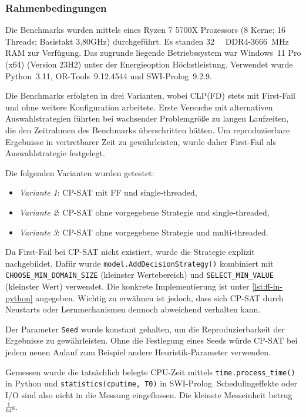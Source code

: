 \documentclass[12pt,a4paper]{article}
\begin{document}
\subsubsection{Rahmenbedingungen}
Die Benchmarks wurden mittels eines Ryzen 7 5700X Prozessors (8 Kerne; 16 Threads; Basistakt 3,80GHz) durchgeführt.
Es standen \SI{32}{\giga\byte} DDR4-\SI{3666}{\mega\hertz} RAM zur Verfügung.
Das zugrunde liegende Betriebssystem war Windows~11 Pro (x64) (Version 23H2) unter der Energieoption \glqq Höchstleistung\grqq.
Verwendet wurde Python~3.11, OR-Tools~9.12.4544 und SWI-Prolog~9.2.9.

Die Benchmarks erfolgten in drei Varianten, wobei CLP(FD) stets mit First-Fail und ohne weitere Konfiguration arbeitete. 
Erste Versuche mit alternativen Auswahlstrategien führten bei wachsender Problemgröße zu langen Laufzeiten, die den Zeitrahmen des Benchmarks überschritten hätten.
Um reproduzierbare Ergebnisse in vertretbarer Zeit zu gewährleisten, wurde daher First-Fail als Auswahlstrategie festgelegt.

\noindent
Die folgenden Varianten wurden getestet:
\begin{itemize}
    \item \emph{Variante 1}: CP-SAT mit FF und single-threaded,
    \item \emph{Variante 2}: CP-SAT ohne vorgegebene Strategie und single-threaded,
    \item \emph{Variante 3}: CP-SAT ohne vorgegebene Strategie und multi-threaded.
\end{itemize}
\noindent
Da First-Fail bei CP-SAT nicht existiert, wurde die Strategie explizit nachgebildet.
Dafür wurde \verb|model.AddDecisionStrategy()| kombiniert mit \texttt{CHOOSE\_MIN\_DOMAIN\_SIZE} (kleinster Wertebereich) und \texttt{SELECT\_MIN\_VALUE} (kleinster Wert) verwendet.
Die konkrete Implementierung ist unter \autoref{lst:ff-in-python} angegeben.
Wichtig zu erwähnen ist jedoch, dass sich CP-SAT durch Neustarts oder Lernmechanismen dennoch abweichend verhalten kann.

Der Parameter \texttt{Seed} wurde konstant gehalten, um die Reproduzierbarkeit der Ergebnisse zu gewährleisten.
Ohne die Festlegung eines Seeds würde CP-SAT bei jedem neuen Anlauf zum Beispiel andere Heuristik-Parameter verwenden.

Gemessen wurde die tatsächlich belegte CPU-Zeit mittels \verb|time.process_time()| in Python und \verb|statistics(cputime, T0)| in SWI-Prolog.
Schedulingeffekte oder I/O sind also nicht in die Messung eingeflossen.
Die kleinste Messeinheit betrug $\frac{1}{64}$s.
\end{document}
